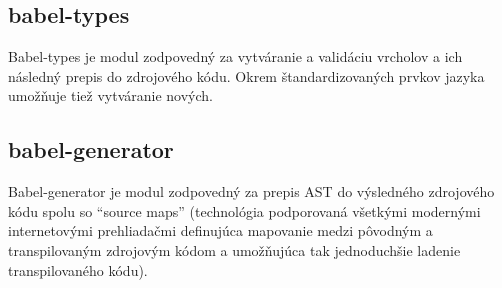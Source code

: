 \subsection{babel-types}
Babel-types je modul zodpovedný za vytváranie a validáciu vrcholov a ich následný prepis do zdrojového kódu. Okrem štandardizovaných prvkov jazyka umožňuje tiež vytváranie nových.

\subsection{babel-generator}
Babel-generator je modul zodpovedný za prepis AST do výsledného zdrojového kódu spolu so ``source maps'' (technológia podporovaná všetkými modernými internetovými prehliadačmi definujúca mapovanie medzi pôvodným a transpilovaným zdrojovým kódom a umožňujúca tak jednoduchšie ladenie transpilovaného kódu).
